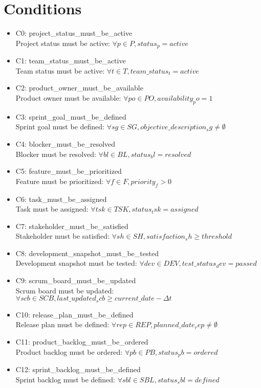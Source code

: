 \documentclass{article}
\begin{document}
\section{Conditions}
\begin{itemize}
    \item C0: project\_status\_must\_be\_active \\
    Project status must be active: $\forall p \in P, status_p = active$
    \item C1: team\_status\_must\_be\_active \\
    Team status must be active: $\forall t \in T, team\_status_t = active$
    \item C2: product\_owner\_must\_be\_available \\
    Product owner must be available: $\forall po \in PO, availability_po = 1$
    \item C3: sprint\_goal\_must\_be\_defined \\
    Sprint goal must be defined: $\forall sg \in SG, objective\_description_sg \neq \emptyset$
    \item C4: blocker\_must\_be\_resolved \\
    Blocker must be resolved: $\forall bl \in BL, status_bl = resolved$
    \item C5: feature\_must\_be\_prioritized \\
    Feature must be prioritized: $\forall f \in F, priority_f > 0$
    \item C6: task\_must\_be\_assigned \\
    Task must be assigned: $\forall tsk \in TSK, status_tsk = assigned$
    \item C7: stakeholder\_must\_be\_satisfied \\
    Stakeholder must be satisfied: $\forall sh \in SH, satisfaction_sh \geq threshold$
    \item C8: development\_snapshot\_must\_be\_tested \\
    Development snapshot must be tested: $\forall dev \in DEV, test\_status_dev = passed$
    \item C9: scrum\_board\_must\_be\_updated \\
    Scrum board must be updated: $\forall scb \in SCB, last\_updated_scb \geq current\_date - \Delta t$
    \item C10: release\_plan\_must\_be\_defined \\
    Release plan must be defined: $\forall rep \in REP, planned\_date_rep \neq \emptyset$
    \item C11: product\_backlog\_must\_be\_ordered \\
    Product backlog must be ordered: $\forall pb \in PB, status_pb = ordered$
    \item C12: sprint\_backlog\_must\_be\_defined \\
    Sprint backlog must be defined: $\forall sbl \in SBL, status_sbl = defined$
\end{itemize}
\end{document}

